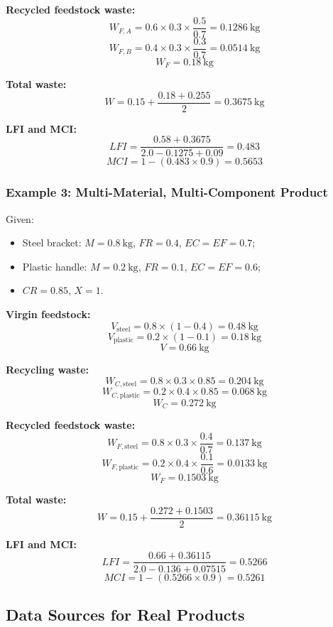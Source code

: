 \documentclass{NoteThesis/note-thesis}
\begin{document}
\textbf{Recycled feedstock waste:}
\[
    W_{F,A} = 0.6 \times 0.3 \times \frac{0.5}{0.7} = 0.1286\ \text{kg}
\]
\[
    W_{F,B} = 0.4 \times 0.3 \times \frac{0.3}{0.7} = 0.0514\ \text{kg}
\]
\[
    W_F = 0.18\ \text{kg}
\]

\textbf{Total waste:}
\[
    W = 0.15 + \frac{0.18 + 0.255}{2} = 0.3675\ \text{kg}
\]

\textbf{LFI and MCI:}
\[
    LFI = \frac{0.58 + 0.3675}{2.0 - 0.1275 + 0.09} = 0.483
\]
\[
    MCI = 1 - (0.483 \times 0.9) = \mathbf{0.5653}
\]

\subsubsection{Example 3: Multi-Material, Multi-Component Product}

Given:
\begin{itemize}
    \item Steel bracket: $M = 0.8\ \text{kg}$, $FR = 0.4$, $EC = EF = 0.7$;
    \item Plastic handle: $M = 0.2\ \text{kg}$, $FR = 0.1$, $EC = EF = 0.6$;
    \item $CR = 0.85$, $X = 1$.
\end{itemize}

\textbf{Virgin feedstock:}
\[
    V_{\text{steel}} = 0.8 \times (1 - 0.4) = 0.48\ \text{kg}
\]
\[
    V_{\text{plastic}} = 0.2 \times (1 - 0.1) = 0.18\ \text{kg}
\]
\[
    V = 0.66\ \text{kg}
\]

\textbf{Recycling waste:}
\[
    W_{C,\text{steel}} = 0.8 \times 0.3 \times 0.85 = 0.204\ \text{kg}
\]
\[
    W_{C,\text{plastic}} = 0.2 \times 0.4 \times 0.85 = 0.068\ \text{kg}
\]
\[
    W_C = 0.272\ \text{kg}
\]

\textbf{Recycled feedstock waste:}
\[
    W_{F,\text{steel}} = 0.8 \times 0.3 \times \frac{0.4}{0.7} = 0.137\ \text{kg}
\]
\[
    W_{F,\text{plastic}} = 0.2 \times 0.4 \times \frac{0.1}{0.6} = 0.0133\ \text{kg}
\]
\[
    W_F = 0.1503\ \text{kg}
\]

\textbf{Total waste:}
\[
    W = 0.15 + \frac{0.272 + 0.1503}{2} = 0.36115\ \text{kg}
\]

\textbf{LFI and MCI:}
\[
    LFI = \frac{0.66 + 0.36115}{2.0 - 0.136 + 0.07515} = 0.5266
\]
\[
    MCI = 1 - (0.5266 \times 0.9) = \mathbf{0.5261}
\]

\subsection{Data Sources for Real Products}
\end{document}
